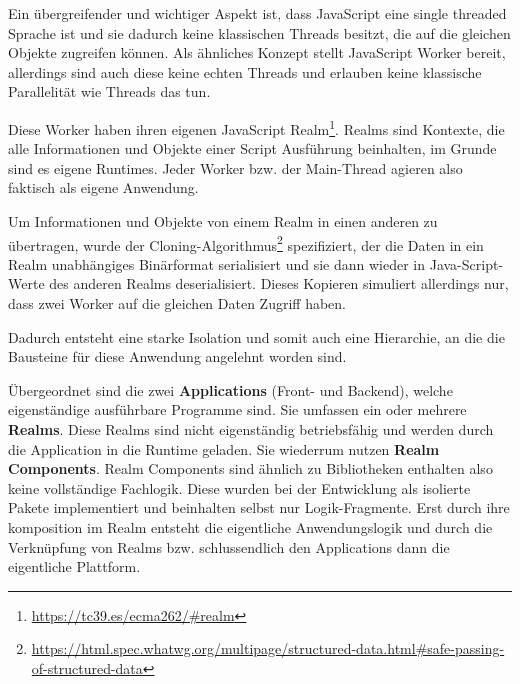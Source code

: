 Ein übergreifender und wichtiger Aspekt ist, dass JavaScript eine single threaded Sprache ist und sie dadurch keine klassischen Threads besitzt, die auf die gleichen Objekte zugreifen können.
Als ähnliches Konzept stellt JavaScript Worker bereit, allerdings sind auch diese keine echten Threads und erlauben keine klassische Parallelität wie Threads das tun.

Diese Worker haben ihren eigenen JavaScript Realm\footnote{\url{https://tc39.es/ecma262/\#realm}}.
Realms sind Kontexte, die alle Informationen und Objekte einer Script Ausführung beinhalten, im Grunde sind es eigene Runtimes.
Jeder Worker bzw. der Main-Thread agieren also faktisch als eigene Anwendung.

Um Informationen und Objekte von einem Realm in einen anderen zu übertragen, wurde der Cloning-Algorithmus\footnote{\url{https://html.spec.whatwg.org/multipage/structured-data.html\#safe-passing-of-structured-data}} spezifiziert, der die Daten in ein Realm unabhängiges Binärformat serialisiert und sie dann wieder in Java-\linebreak Script-Werte des anderen Realms deserialisiert.
Dieses Kopieren simuliert allerdings nur, dass zwei Worker auf die gleichen Daten Zugriff haben.

Dadurch entsteht eine starke Isolation und somit auch eine Hierarchie, an die die Bausteine für diese Anwendung angelehnt worden sind.

Übergeordnet sind die zwei \textbf{Applications} (Front- und Backend), welche eigenständige ausführbare Programme sind.
Sie umfassen ein oder mehrere \textbf{Realms}.
Diese Realms sind nicht eigenständig betriebsfähig und werden durch die Application in die Runtime geladen.
Sie wiederrum nutzen \textbf{Realm Components}.
Realm Components sind ähnlich zu Bibliotheken enthalten also keine vollständige Fachlogik.
Diese wurden bei der Entwicklung als isolierte Pakete implementiert und beinhalten selbst nur Logik-Fragmente.
Erst durch ihre komposition im Realm entsteht die eigentliche Anwendungslogik und durch die Verknüpfung von Realms bzw. schlussendlich den Applications dann die eigentliche Plattform.
